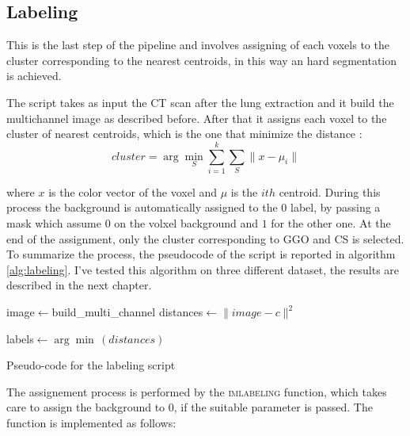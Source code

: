 
	
	\subsection{Labeling}
	
	
	
	
	This is the last step of the pipeline and involves assigning of  each voxels to the cluster corresponding to the nearest centroids, in this way an hard segmentation is achieved.
	
	The script takes as input the CT scan after the lung extraction and it build the multichannel image as described before. After that it assigns each voxel to the cluster of nearest centroids, which is the one that minimize the distance : 
	\begin{equation}
		cluster = \arg\min_{S}  \sum_{i=1}^k \sum_{S} \| x - \mu_i\|
	\end{equation}
	
	where $x$ is the color vector of the voxel and $\mu$ is the $ith$ centroid. During this process the background is automatically assigned to the 0 label, by passing a mask which assume $0$ on the volxel background and $1$ for the other one. At the end of the assignment, only the cluster corresponding to GGO and CS is selected.
	To summarize the process, the pseudocode of the script is reported in algorithm\,\ref{alg:labeling}.
	I've tested this algorithm on three different dataset, the results are described in the next chapter.
	
	\begin{algorithm}
		
		\SetAlgoLined
		\DontPrintSemicolon
		
		
		
		image$\leftarrow$build\_multi\_channel\;
		{
			distances$\leftarrow\| image - c\|^2$\;
		}
		
		labels$\leftarrow\arg\min\,(distances)$\;
		
		\caption{Pseudo-code for the labeling script}\label{alg:labeling}
		
	\end{algorithm}
	

	The assignement process is performed by the \textsc{imlabeling} function, which takes care to assign the background to $0$, if the suitable parameter is passed.  The function is implemented as follows:
		
